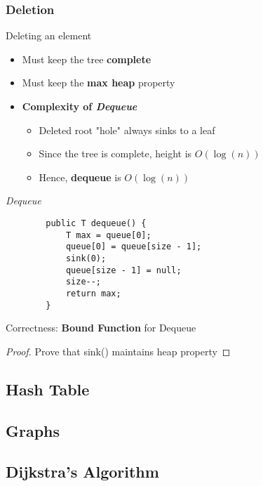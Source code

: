 \documentclass[10pt, 
a4paper, 
oneside, 
headinclude, footinclude, 
BCOR5mm]
{scrartcl}
\begin{document}
\subsubsection{Deletion}
\begin{definition}
    Deleting an element
    \begin{itemize}
        \item Must keep the tree \textbf{complete}
        \item Must keep the \textbf{max heap} property 
        \item \textbf{Complexity of \textit{Dequeue}}
        \begin{itemize}
            \item Deleted root "hole" always sinks to a leaf
            \item Since the tree is complete, height is $O(\log(n))$
            \item Hence, \textbf{dequeue} is $O(\log(n))$
        \end{itemize}
    \end{itemize}
    \textit{Dequeue}
    \begin{lstlisting}
        public T dequeue() {
            T max = queue[0];
            queue[0] = queue[size - 1];
            sink(0);
            queue[size - 1] = null;
            size--;
            return max;
        }
    \end{lstlisting}
    Correctness: \textbf{Bound Function} for Dequeue
    \begin{proof}
        Prove that sink() maintains heap property
    \end{proof}
\end{definition}

\newpage
\subsection{Hash Table}

\newpage
\subsection{Graphs}


\newpage
\subsection{Dijkstra's Algorithm}
\end{document}
